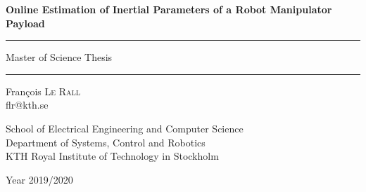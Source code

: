 \begin{center}
\vspace{3ex}


\vspace*{10ex}

{\Huge \bf Online Estimation of Inertial Parameters of a Robot Manipulator Payload}

\vspace{5ex}

\rule{\linewidth}{.5pt}

\vspace{1ex}
{\huge Master of Science Thesis}
\rule{\linewidth}{.5pt}

\vspace{5ex}


\end{center}

\vspace{1ex}

\begin{center}
      {\large François \textsc{Le Rall}} \\
      flr@kth.se
  \end{center}

  \begin{center}
    \vfill
    School of Electrical Engineering and Computer Science \\
    Department of Systems, Control and Robotics \\
    KTH Royal Institute of Technology in Stockholm
  \end{center}


\begin{center}
  \vfill
  Year 2019/2020 \hfill
\end{center}
